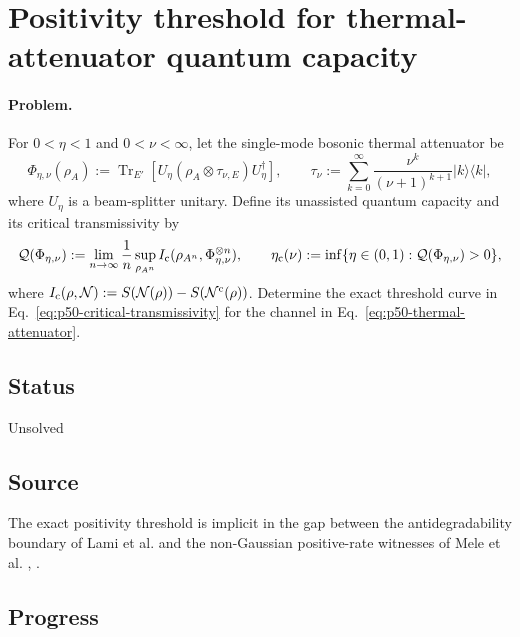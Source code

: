 \section{Positivity threshold for thermal-attenuator quantum capacity}
\label{sec:problem-50}

\paragraph{Problem.}
For $0<\eta<1$ and $0<\nu<\infty$, let the single-mode bosonic thermal
attenuator be
\begin{equation}
  \Phi_{\eta,\nu}(\rho_A)
  :=\operatorname{Tr}_{E'}\!\left[
     U_\eta(\rho_A\otimes\tau_{\nu,E})U_\eta^\dagger
  \right],
  \qquad
  \tau_\nu:=\sum_{k=0}^{\infty}
     \frac{\nu^k}{(\nu+1)^{k+1}}|k\rangle\!\langle k|,
  \label{eq:p50-thermal-attenuator}
\end{equation}
where $U_\eta$ is a beam-splitter unitary.  Define its unassisted quantum
capacity and its critical transmissivity by
\begin{equation}
  \mathcal Q(\Phi_{\eta,\nu})
  :=\lim_{n\to\infty}\frac1n\sup_{\rho_{A^n}}
       I_{\rm c}(\rho_{A^n},\Phi_{\eta,\nu}^{\otimes n}),
  \qquad
  \eta_{\rm c}(\nu)
  :=\inf\{\eta\in(0,1):\mathcal Q(\Phi_{\eta,\nu})>0\},
  \label{eq:p50-critical-transmissivity}
\end{equation}
where $I_{\rm c}(\rho,\mathcal N)
:=S(\mathcal N(\rho))-S(\mathcal N^{\rm c}(\rho))$.  Determine the exact
threshold curve in Eq.~\eqref{eq:p50-critical-transmissivity} for the channel
in Eq.~\eqref{eq:p50-thermal-attenuator}.

\subsection*{Status}

Unsolved

\subsection*{Source}

The exact positivity threshold is implicit in the gap between the
antidegradability boundary of Lami et al. and the non-Gaussian positive-rate
witnesses of Mele et al. ,
.

\subsection*{Progress}


